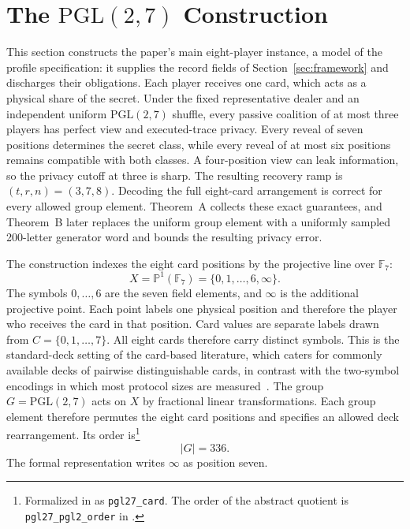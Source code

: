 \documentclass[runningheads]{llncs}
\newcommand{\coqin}[1]{\texttt{#1}}
\newcommand{\PG}{\mathrm{PGL}(2,7)}
\begin{document}
\section{The \texorpdfstring{$\PG$}{PGL(2,7)} Construction}\label{sec:pgl}

This section constructs the paper's main eight-player instance, a model of
the profile specification: it supplies the record fields of
Section~\ref{sec:framework} and discharges their obligations. Each player
receives one card, which acts as a physical share of the secret. Under the
fixed representative dealer and an independent uniform $\PG$ shuffle, every
passive coalition of at most three players has perfect view and
executed-trace privacy. Every reveal of seven positions determines the
secret class, while every reveal of at most six positions remains compatible
with both classes. A four-position view can leak information, so the privacy
cutoff at three is sharp. The resulting recovery ramp is
$(t,r,n)=(3,7,8)$. Decoding the full eight-card arrangement is correct for
every allowed group element. Theorem~A collects these exact guarantees, and
Theorem~B later replaces the uniform group element with a uniformly sampled
200-letter generator word and bounds the resulting privacy error.

The construction indexes the eight card positions by the projective line
over $\mathbb{F}_7$:
\[
  X=\mathbb{P}^1(\mathbb{F}_7)=\{0,1,\ldots,6,\infty\}.
\]
The symbols $0,\ldots,6$ are the seven field elements, and $\infty$ is the
additional projective point. Each point labels one physical position and
therefore the player who receives the card in that position. Card values are
separate labels drawn from $C=\{0,1,\ldots,7\}$. All eight cards therefore
carry distinct symbols. This is the standard-deck setting of the card-based
literature, which caters for commonly available decks of pairwise
distinguishable cards, in contrast with the two-symbol encodings in which
most protocol sizes are measured~\cite{NiemiRenvall1999,Koch2019}. The group $G=\PG$ acts on
$X$ by fractional linear transformations. Each group element therefore
permutes the eight card positions and specifies an allowed deck
rearrangement. Its order is\footnote{Formalized in
 as \coqin{pgl27\_card}. The
order of the abstract quotient is \coqin{pgl27\_pgl2\_order} in
.}
\begin{equation}
  \lvert G\rvert=336.
  \label{eq:pgl-order}
\end{equation}
The formal representation writes $\infty$ as position seven.
\end{document}
